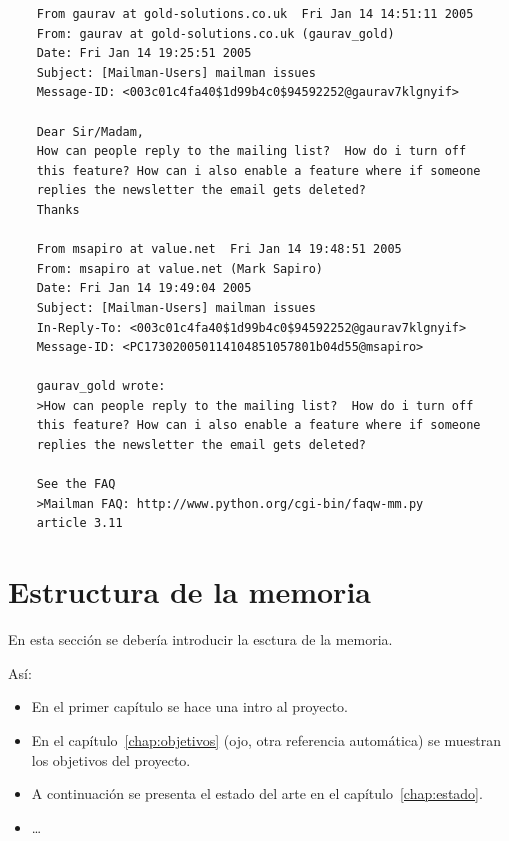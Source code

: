 \documentclass[a4paper, 12pt]{book}
\begin{document}
{\footnotesize
\begin{verbatim}
    From gaurav at gold-solutions.co.uk  Fri Jan 14 14:51:11 2005
    From: gaurav at gold-solutions.co.uk (gaurav_gold)
    Date: Fri Jan 14 19:25:51 2005
    Subject: [Mailman-Users] mailman issues
    Message-ID: <003c01c4fa40$1d99b4c0$94592252@gaurav7klgnyif>

    Dear Sir/Madam,
    How can people reply to the mailing list?  How do i turn off
    this feature? How can i also enable a feature where if someone
    replies the newsletter the email gets deleted?
    Thanks

    From msapiro at value.net  Fri Jan 14 19:48:51 2005
    From: msapiro at value.net (Mark Sapiro)
    Date: Fri Jan 14 19:49:04 2005
    Subject: [Mailman-Users] mailman issues
    In-Reply-To: <003c01c4fa40$1d99b4c0$94592252@gaurav7klgnyif>
    Message-ID: <PC173020050114104851057801b04d55@msapiro>

    gaurav_gold wrote:
    >How can people reply to the mailing list?  How do i turn off
    this feature? How can i also enable a feature where if someone
    replies the newsletter the email gets deleted?

    See the FAQ
    >Mailman FAQ: http://www.python.org/cgi-bin/faqw-mm.py
    article 3.11
\end{verbatim}
}

\section{Estructura de la memoria}
\label{sec:estructura}

En esta sección se debería introducir la esctura de la memoria. 

Así:

\begin{itemize}
  \item En el primer capítulo se hace una intro al proyecto.
  
  \item En el capítulo~\ref{chap:objetivos} (ojo, otra referencia automática) se muestran los objetivos del proyecto.
  
  \item A continuación se presenta el estado del arte en el capítulo~\ref{chap:estado}.
  
  \item \ldots
\end{itemize}



\end{document}
